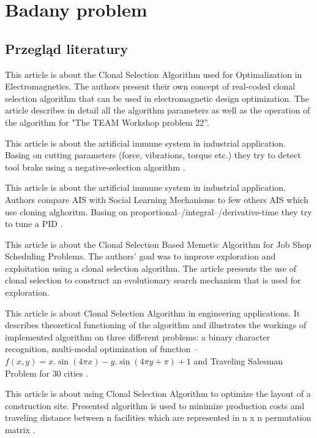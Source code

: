 \documentclass[a4paper]{article}
\begin{document}
\section{Badany problem}
\subsection{Przegląd literatury}
This article is about the Clonal Selection Algorithm used for Optimalization in Electromagnetics. The authors present their own concept of real-coded clonal selection algorithm that can be used in electromagnetic design optimization. The article describes in detail all the algorithm parameters as well as the operation of the algorithm for "The TEAM Workshop problem 22”\cite{1430953}.



This article is about the artificial immune system in industrial application. Basing on cutting parameters (force, vibrations, torque etc.) they try to detect tool brake using a negative-selection algorithm \cite{dasgupta1999artificial}.



This article is about the artificial immune system in industrial application. Authors compare AIS with Social Learning Mechanisms to few others AIS which use cloning alghoritm. Basing on proportional–/integral–/derivative-time they try to tune a PID \cite{wang_artificial_2017}.



This article is about the Clonal Selection Based Memetic Algorithm for Job Shop Scheduling Problems. The authors' goal was to improve exploration and exploitation using a clonal selection algorithm. The article presents the use of clonal selection to construct an evolutionary search mechanism that is used for exploration\cite{yang2008clonal}.


This article is about Clonal Selection Algorithm in engineering applications. It describes theoretical functioning of the algorithm and illustrates the workings of implemented algorithm on three different problems: a binary character recognition, multi-modal optimization of function – 
$f(x, y) = x.\sin(4 \pi x) - y.\sin(4 \pi y + \pi) + 1$
and Traveling Salesman Problem for 30 cities \cite{de_castro}.


This article is about using Clonal Selection Algorithm to optimize the layout of a construction site. Presented algorithm is used to minimize production costs and traveling distance between n facilities which are represented in n x n permutation matrix \cite{WANG2016267}.
\end{document}
